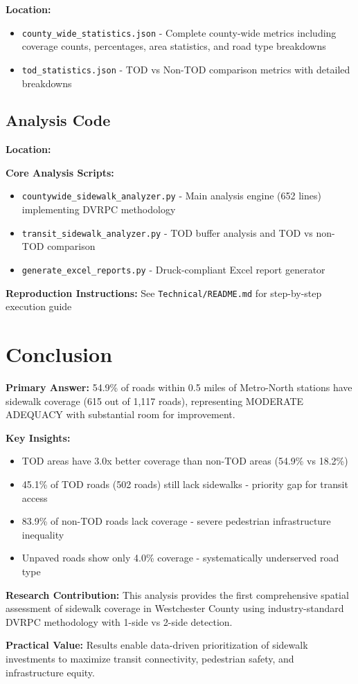 \documentclass[11pt,letterpaper]{article}
\begin{document}
\textbf{Location:} \texttt{}

\begin{itemize}
    \item \texttt{county\_wide\_statistics.json} - Complete county-wide metrics including coverage counts, percentages, area statistics, and road type breakdowns
    \item \texttt{tod\_statistics.json} - TOD vs Non-TOD comparison metrics with detailed breakdowns
\end{itemize}

\subsection{Analysis Code}

\textbf{Location:} \texttt{}

\textbf{Core Analysis Scripts:}
\begin{itemize}
    \item \texttt{countywide\_sidewalk\_analyzer.py} - Main analysis engine (652 lines) implementing DVRPC methodology
    \item \texttt{transit\_sidewalk\_analyzer.py} - TOD buffer analysis and TOD vs non-TOD comparison
    \item \texttt{generate\_excel\_reports.py} - Druck-compliant Excel report generator
\end{itemize}

\textbf{Reproduction Instructions:} See \texttt{Technical/README.md} for step-by-step execution guide

\section{Conclusion}

\textbf{Primary Answer:} 54.9\% of roads within 0.5 miles of Metro-North stations have sidewalk coverage (615 out of 1,117 roads), representing MODERATE ADEQUACY with substantial room for improvement.

\textbf{Key Insights:}
\begin{itemize}
    \item TOD areas have 3.0x better coverage than non-TOD areas (54.9\% vs 18.2\%)
    \item 45.1\% of TOD roads (502 roads) still lack sidewalks - priority gap for transit access
    \item 83.9\% of non-TOD roads lack coverage - severe pedestrian infrastructure inequality
    \item Unpaved roads show only 4.0\% coverage - systematically underserved road type
\end{itemize}

\textbf{Research Contribution:} This analysis provides the first comprehensive spatial assessment of sidewalk coverage in Westchester County using industry-standard DVRPC methodology with 1-side vs 2-side detection.

\textbf{Practical Value:} Results enable data-driven prioritization of sidewalk investments to maximize transit connectivity, pedestrian safety, and infrastructure equity.
\end{document}
